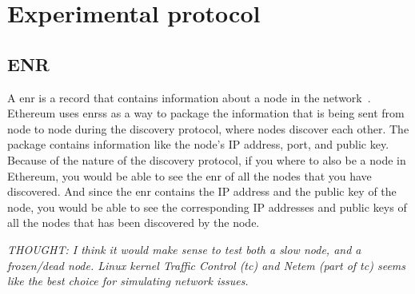 

\section{Experimental protocol}\label{sec:experimental-protocol}

\subsection{ENR}\label{subsec:enr}
A \gls{enr} is a record that contains information about a node in the network~\cite{EIP-778:Ethereum-Node-Records}.
Ethereum uses \glspl{enr}s as a way to package the information that is being sent from node to node during the discovery protocol, where nodes discover each other.
The package contains information like the node's IP address, port, and public key.
Because of the nature of the discovery protocol, if you where to also be a node in Ethereum, you would be able to see the \gls{enr} of all the nodes that you have discovered.
And since the \gls{enr} contains the IP address and the public key of the node, you would be able to see the corresponding IP addresses and public keys of all the nodes that has been discovered by the node.



\textit{THOUGHT: I think it would make sense to test both a slow node, and a frozen/dead node.
Linux kernel Traffic Control (tc) and Netem (part of tc) seems like the best choice for simulating network issues.}
